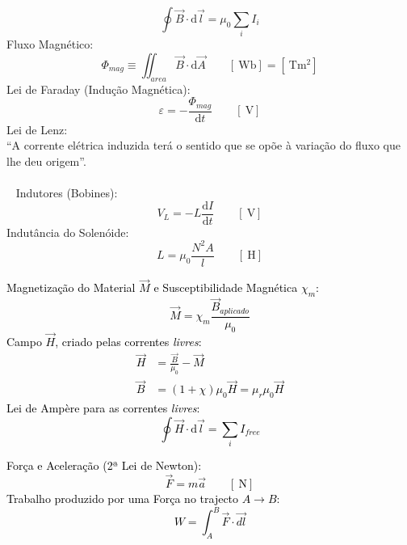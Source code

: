 \documentclass[a4paper,10pt]{extarticle} %
\newcommand{\mybox}[2]{
    \begin{tcolorbox}[colback=lightblue!5!white,colframe=lightblue!75!black,boxsep=1pt,arc=0pt,outer arc=0pt,title={\textcolor{black}{#1}}]
        \textcolor{black}{#2}
    \end{tcolorbox}
}
\begin{document}
\begin{multicols}{2}
{\begin{equation}
        \oint \vec{B} \cdot  \mathrm{d}\vec{l} = \mu_0 \sum_i I_i
    \end{equation}
     Fluxo Magnético:
    \begin{equation}
        \Phi_{mag} \equiv \iint_{area} \vec{B} \cdot \mathrm{d}\vec{A} \qquad  [\SI{}{\weber}]= [\SI{}{\tesla\meter\squared}]
    \end{equation}
    Lei de Faraday (Indução Magnética):
    \begin{equation}
        \varepsilon = -\frac{\Phi_{mag}}{\mathrm{d} t} \qquad [\SI{}{\volt}]
    \end{equation}
    Lei de Lenz:\\
    ``A corrente elétrica induzida terá o sentido que se opõe à variação do fluxo que lhe deu origem''.\\
    \\~
    Indutores (Bobines):
    \begin{equation}
        V_L = - L\frac{\mathrm{d} I}{\mathrm{d} t} \qquad [\SI{}{\volt}]
    \end{equation}
     Indutância do Solenóide:
    \begin{equation}
        L = \mu_0 \frac{N^2 A}{l} \qquad [\SI{}{\henry}]
    \end{equation}
}
\mybox{Ferromagnetismo.}{
    Magnetização do Material $\vec{M}$ e Susceptibilidade Magnética $\chi_m$:
    \begin{equation}
        \vec{M} = \chi_m\frac{\vec{B}_{aplicado}}{\mu_0}
    \end{equation}
    Campo $\vec{H}$, criado pelas correntes \emph{livres}:
    \begin{align}
        \vec{H} &= \frac{\vec{B}}{\mu_0} - \vec{M}\\
        \vec{B} &= (1 + \chi) \mu_0 \vec{H} = \mu_r \mu_0 \vec{H}
    \end{align}
    Lei de Ampère para as correntes \emph{livres}:
    \begin{equation}
        \oint \vec{H} \cdot  \mathrm{d}\vec{l} = \sum_i I_{free}
    \end{equation}
}
%
\mybox{Dinâmica}{
    Força e Aceleração (2ª Lei de Newton):
    \begin{equation*}
        \vec{F}= m \vec{a} \qquad [\SI{}{\newton}]
    \end{equation*}
    Trabalho produzido por uma Força no trajecto \( A \to B\):
    \begin{equation*}
        W = \int_A^B \vec{F} \cdot  \vec{dl}
    \end{equation*}
}
\end{multicols}
\end{document}
